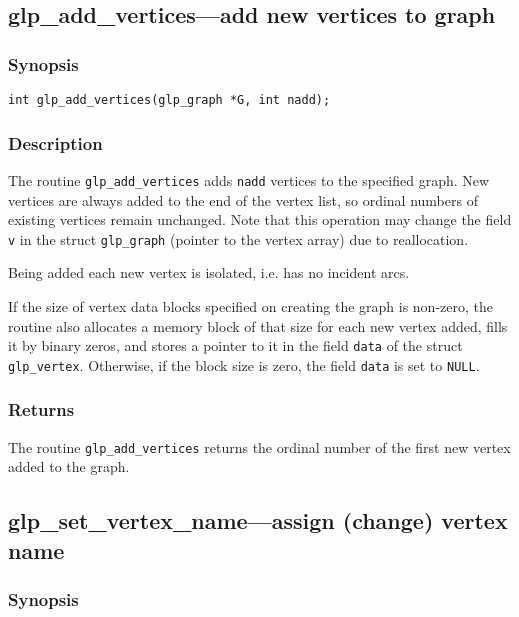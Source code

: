 \documentclass[dvipdfm,11pt]{report}
\begin{document}
\newpage

\subsection{glp\_add\_vertices---add new vertices to graph}

\subsubsection*{Synopsis}

\begin{verbatim}
int glp_add_vertices(glp_graph *G, int nadd);
\end{verbatim}

\subsubsection*{Description}

The routine \verb|glp_add_vertices| adds \verb|nadd| vertices to the
specified graph. New vertices are always added to the end of the vertex
list, so ordinal numbers of existing vertices remain unchanged. Note
that this operation may change the field \verb|v| in the struct
\verb|glp_graph| (pointer to the vertex array) due to reallocation.

Being added each new vertex is isolated, i.e. has no incident arcs.

If the size of vertex data blocks specified on creating the graph is
non-zero, the routine also allocates a memory block of that size for
each new vertex added, fills it by binary zeros, and stores a pointer to
it in the field \verb|data| of the struct \verb|glp_vertex|. Otherwise,
if the block size is zero, the field \verb|data| is set to \verb|NULL|.

\subsubsection*{Returns}

The routine \verb|glp_add_vertices| returns the ordinal number of the
first new vertex added to the graph.

\subsection{glp\_set\_vertex\_name---assign (change) vertex name}

\subsubsection*{Synopsis}
\end{document}
